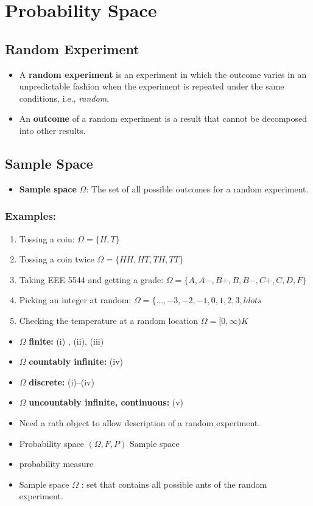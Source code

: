 \section{Probability Space}

\subsection{Random Experiment}
\begin{itemize}
\item A \textbf{random experiment} is an experiment in which the
outcome varies in an unpredictable fashion when the experiment is
repeated under the same conditions, i.e., \emph{random}.
\item An \textbf{outcome} of a random experiment is a result that
cannot be decomposed into other results.
\end{itemize}

\subsection{Sample Space}
\begin{itemize}
\item \textbf{Sample space} \(\Omega\): The set of all possible outcomes for a random experiment.
\end{itemize}

\subsubsection{Examples:}
\begin{enumerate}[label=(\roman*)]
\item Tossing a coin: \(\Omega=\{H, T\}\)
\item Tossing a coin twice \(\Omega=\{H H, H T, T H, T T\}\)
\item Taking EEE 5544 and getting a grade:
\(
\Omega=\{A, A-, B+, B, B-, C+, C, D, F\}
\)
\item Picking an integer at random:
\(\Omega=\{\ldots,-3,-2,-1,0,1,2,3, ldots\)
\item Checking the temperature at a random location
\(
\Omega=[0, \infty) K
\)
\end{enumerate}

\begin{itemize}
\item \(\Omega\) \textbf{finite:}  (i) , (ii), (iii)
\item \(\Omega\) \textbf{countably infinite:} (iv)
\item \(\Omega\) \textbf{discrete:} (i)--(iv)
\item \(\Omega\) \textbf{uncountably infinite, continuous:} (v)
\end{itemize}



\begin{itemize}
  \item[-] Need a rath object to allow description of a random experiment.
  \item[-] Probability space \((\Omega, F, P)\) Sample space
  \item[] probability measure
  \item[-] Sample space \(\Omega\) : set that contains all possible ants of the random experiment.
\end{itemize}
